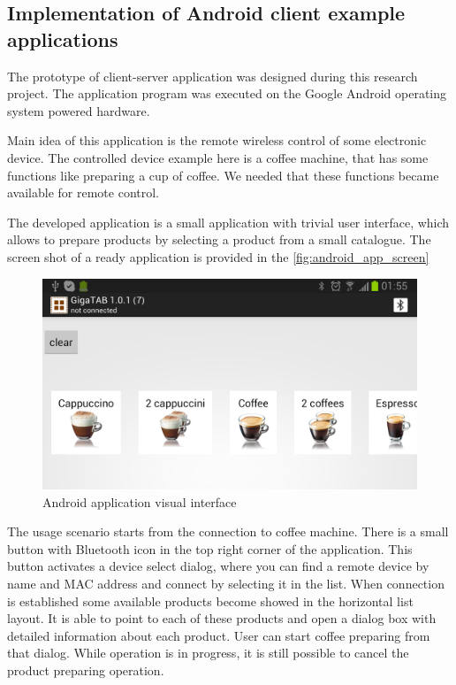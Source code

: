 \newpage
\subsection{Implementation of Android client example applications}

The prototype of client-server application was designed during this research project.
The application program was executed on the Google Android operating system powered hardware.


Main idea of this application is the remote wireless control of some electronic device. 
The controlled device example here is a coffee machine, that has some functions like preparing a cup of coffee.
We needed that these functions became available for remote control.

The developed application is a small application with trivial user interface, which allows to prepare products by selecting a product from a small catalogue. 
The screen shot of a ready application is provided  in the \autoref{fig:android_app_screen}

\begin{center}
 \begin{figure}[h]
	\includegraphics[width=\textwidth]{../images/implementation/android_app_screen.png}
	\caption{Android application visual interface }
	\label{fig:android_app_screen}
 \end{figure}
\end{center}

The usage scenario starts from the connection to coffee machine.
There is a small button with Bluetooth icon in the top right corner of the application.
This button activates a device select dialog, where you can find a remote device by name and MAC address and connect by selecting it in the list.
When connection is established some available products become showed in the horizontal list layout.
It is able to point to each of these products and open a dialog box with detailed information about each product.
User can start coffee preparing from that dialog.
While operation is in progress, it is still possible to cancel the product preparing operation.

